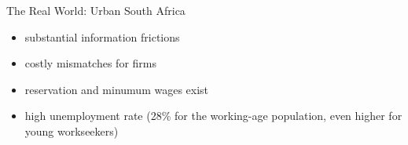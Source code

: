 \begin{frame}{The Real World: Urban South Africa}
    \begin{itemize}
        \item substantial information frictions
        \item costly mismatches for firms
        \item reservation and minumum wages exist
        \item high unemployment rate {\scriptsize(28\% for the working-age population, even higher for young workseekers)}
    \end{itemize}
    
\end{frame}


    